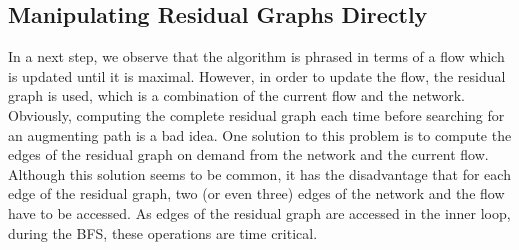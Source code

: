 \documentclass{llncs}
\begin{document}
%   
% 
%   
%   
     
  \subsection{Manipulating Residual Graphs Directly}\label{sec:impl_res_graph}
  In a next step, we observe that the algorithm is phrased in terms of a flow which is updated until it is maximal. However,
  in order to update the flow, the residual graph is used, which is a combination of the current flow and the network.
  Obviously, computing the complete residual graph each time before searching for an augmenting path is a bad idea. 
  One solution to this problem is to compute the edges of the residual graph on demand from the network and the current flow.
  Although this solution seems to be common, it has the disadvantage that for each edge of the residual graph, two (or even three) 
  edges of the network and the flow have to be accessed. As edges of the residual graph are accessed in the inner loop, during 
  the BFS, these operations are time critical.
  
\end{document}
